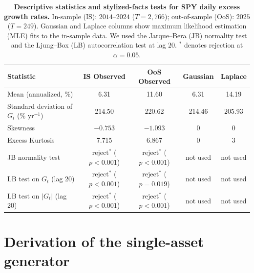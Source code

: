 
\begin{table}[H]
\centering
\caption{\textbf{Descriptive statistics and stylized-facts tests for
    SPY daily excess growth rates.} In-sample (IS): $2014$--$2024$
    ($T = 2{,}766$); out-of-sample (OoS): $2025$ ($T = 249$).
    Gaussian and Laplace columns show maximum likelihood estimation
    (MLE) fits to the in-sample data. We used the Jarque--Bera (JB)
    normality test and the Ljung--Box (LB) autocorrelation test at lag
    $20$. $^{\ast}$ denotes rejection at
    $\alpha = 0.05$.}
\label{tab:descriptive_stats}
\small
\begin{tabular}{@{}lcccc@{}}
\toprule
\textbf{Statistic} & \textbf{IS Observed} & \textbf{OoS Observed} & \textbf{Gaussian} & \textbf{Laplace} \\ \midrule
Mean (annualized, \%)       & 6.31   & 11.60  & 6.31   & 14.19  \\
Standard deviation of $G_t$ (\% yr$^{-1}$) & 214.50 & 220.62 & 214.46 & 205.93 \\
Skewness                    & $-0.753$ & $-1.093$ & 0    & 0      \\
Excess Kurtosis             & 7.715  & 6.867  & 0      & 3      \\
JB normality test           & reject$^\ast$ ($p<0.001$) & reject$^\ast$ ($p<0.001$) & not used & not used \\
LB test on $G_t$ (lag 20)   & reject$^\ast$ ($p<0.001$) & reject$^\ast$ ($p=0.019$) & not used & not used \\
LB test on $|G_t|$ (lag 20) & reject$^\ast$ ($p<0.001$) & reject$^\ast$ ($p<0.001$) & not used & not used \\
\bottomrule
\end{tabular}
\end{table}

\section{Derivation of the single-asset generator}
\label{sec:supp-generator}

